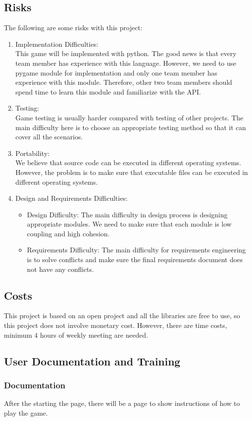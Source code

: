 \documentclass[12pt]{article}
\begin{document}
\subsection{Risks}
The following are some risks with this project:
\begin{enumerate}[{R}1:]
\item Implementation Difficulties: \\This game will be implemented with python.
The good news is that every team member has
experience with this language. However, we need to use pygame module for implementation and only one team member has experience with this module. Therefore, other two team members should spend time to learn this module and familiarize with the API.
\item Testing:\\ Game testing is usually harder compared with
testing of other projects. The main difficulty here is to choose an appropriate
testing method so that it can cover all the scenarios.
\item Portability:\\
We believe that source code can be executed
in different operating systems. However, the
problem is to make sure that executable files
can be executed in different operating systems.
\newpage
\item Design and Requirements Difficulties:
\begin{itemize}
\item Design Difficulty: The main difficulty in design process is designing appropriate modules. We need to make sure 
that each module is low coupling and high cohesion.
\item Requirements Difficulty: The main difficulty for requirements engineering is 
to solve conflicts and make sure the final
requirements document does not have any conflicts. 
\end{itemize}
\end{enumerate}
\subsection{Costs}
This project is based on an open project and all the libraries
are free to use, so this project does not involve monetary cost. However, there are time costs, minimum 4 hours of 
weekly meeting are needed.
\subsection{User Documentation and Training}
\subsubsection{Documentation}
After the starting the page, there will be a page to show
instructions of how to play the game.
\end{document}
